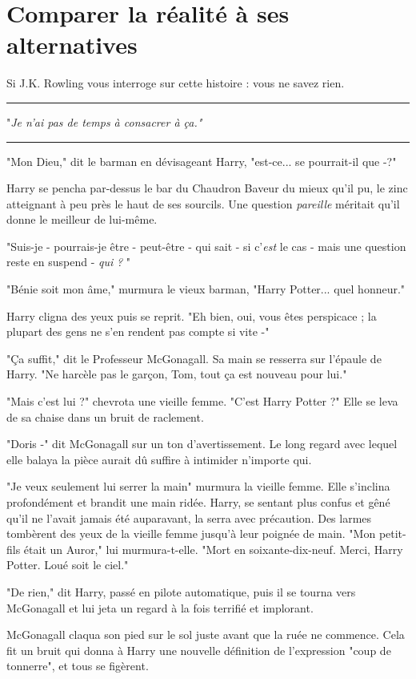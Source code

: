 
\chapter{Comparer la réalité à ses alternatives}

Si J.K. Rowling vous interroge sur cette histoire : vous ne savez rien.
\par\noindent\rule{\textwidth}{0.4pt}
"\emph{Je n'ai pas de temps à consacrer à ça."} 
\par\noindent\rule{\textwidth}{0.4pt}
"Mon Dieu," dit le barman en dévisageant Harry, "est-ce... se pourrait-il que -?"

Harry se pencha par-dessus le bar du Chaudron Baveur du mieux qu'il pu, le zinc atteignant à peu près le haut de ses sourcils. Une question \emph{pareille}  méritait qu'il donne le meilleur de lui-même.

"Suis-je - pourrais-je être - peut-être - qui sait - si c'\emph{est}  le cas - mais une question reste en suspend - \emph{qui}  \emph{?} "

"Bénie soit mon âme," murmura le vieux barman, "Harry Potter... quel honneur."

Harry cligna des yeux puis se reprit. "Eh bien, oui, vous êtes perspicace ; la plupart des gens ne s'en rendent pas compte si vite -"

"Ça suffit," dit le Professeur McGonagall. Sa main se resserra sur l'épaule de Harry. "Ne harcèle pas le garçon, Tom, tout ça est nouveau pour lui."

"Mais c'est lui ?" chevrota une vieille femme. "C'est Harry Potter ?" Elle se leva de sa chaise dans un bruit de raclement.

"Doris -" dit McGonagall sur un ton d'avertissement. Le long regard avec lequel elle balaya la pièce aurait dû suffire à intimider n'importe qui.

"Je veux seulement lui serrer la main" murmura la vieille femme. Elle s'inclina profondément et brandit une main ridée. Harry, se sentant plus confus et gêné qu'il ne l'avait jamais été auparavant, la serra avec précaution. Des larmes tombèrent des yeux de la vieille femme jusqu'à leur poignée de main. "Mon petit-fils était un Auror," lui murmura-t-elle. "Mort en soixante-dix-neuf. Merci, Harry Potter. Loué soit le ciel."

"De rien," dit Harry, passé en pilote automatique, puis il se tourna vers McGonagall et lui jeta un regard à la fois terrifié et implorant.

McGonagall claqua son pied sur le sol juste avant que la ruée ne commence. Cela fit un bruit qui donna à Harry une nouvelle définition de l'expression "coup de tonnerre", et tous se figèrent.

